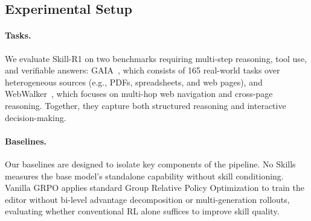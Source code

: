 \subsection{Experimental Setup}
\paragraph{Tasks.}We evaluate Skill-R1 on two benchmarks requiring multi-step reasoning, tool use, and verifiable answers: GAIA~\citep{mialon2024gaia}, which consists of 165 real-world tasks over heterogeneous sources (e.g., PDFs, spreadsheets, and web pages), and WebWalker~\citep{wu2025webwalker}, which focuses on multi-hop web navigation and cross-page reasoning. Together, they capture both structured reasoning and interactive decision-making.

\paragraph{Baselines.} Our baselines are designed to isolate key components of the pipeline. No Skills measures the base model’s standalone capability without skill conditioning. Vanilla GRPO applies standard Group Relative Policy Optimization to train the editor without bi-level advantage decomposition or multi-generation rollouts, evaluating whether conventional RL alone suffices to improve skill quality.

